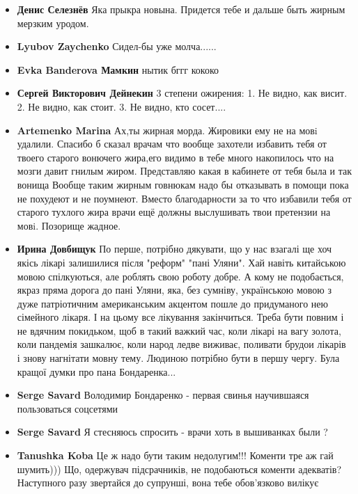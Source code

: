 \begin{itemize}
\item \textbf{Денис Селезнёв}
Яка прыкра новына. Придется тебе и дальше быть жирным мерзким уродом. 

\item \textbf{Lyubov Zaychenko} Сидел-бы уже молча......
\item \textbf{Evka Banderova Мамкин} нытик бггг кококо
\item \textbf{Сергей Викторович Дейнекин}
3 степени ожирения:
1. Не видно, как висит.
2. Не видно, как стоит.
3. Не видно, кто сосет....

\item \textbf{Artemenko Marina}
Ах,ты жирная морда. Жировики ему не на мовi удалили. Спасибо б сказал врачам
что вообще захотели избавить тебя от твоего старого вонючего жира,его видимо в
тебе много накопилось что на мозги давит гнилым жиром. Представляю какая в
кабинете от тебя была и так вонища Вообще таким жирным говнюкам надо бы
отказывать в помощи пока не похудеют и не поумнеют. Вместо благодарности за то
что избавили тебя от старого тухлого жира врачи ещё должны выслушивать твои
претензии на мовi. Позорище жадное.

\item \textbf{Ирина Довбищук}
По перше, потрібно дякувати, що у нас взагалі ще хоч якісь лікарі залишилися після "реформ" "пані Уляни". Хай навіть китайською мовою спілкуються, але роблять свою роботу добре. А кому не подобається, якраз пряма дорога до пані Уляни, яка, без сумніву, українською мовою з дуже патріотичним американським акцентом пошле до придуманого нею сімейного лікаря. І на цьому все лікування закінчиться. Треба бути повним і не вдячним покидьком, щоб в такий важкий час, коли лікарі на вагу золота, коли пандемія зашкалює, коли народ ледве виживає, поливати брудои лікарів і знову нагнітати мовну тему. Людиною потрібно бути в першу чергу. Була кращої думки про пана Бондаренка...

\item \textbf{Serge Savard}
Володимир Бондаренко - первая свинья научившаяся пользоваться соцсетями

\item \textbf{Serge Savard}
Я стесняюсь спросить - врачи хоть в вышиванках были ?

\item \textbf{Tanushka Koba}
Це ж надо бути таким недолугим!!! Коменти тре аж гай шумить))) Що, одержувач підсрачників, не подобаються коменти адекватів? Наступного разу звертайся до супрунші, вона тебе обов'язково вилікує


\end{itemize}
